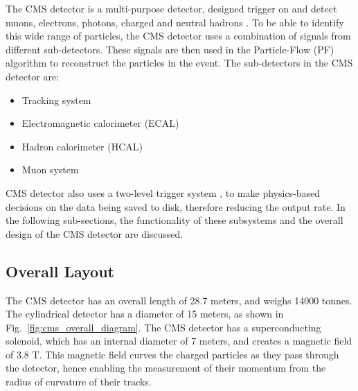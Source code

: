 The CMS detector is a multi-purpose detector, designed trigger on \cite{cms:l1_paper,cms:hlt_paper} and detect muons, electrons, photons, charged and 
neutral hadrons \cite{cms:elepho_paper,cms:muon_paper,cms:vertex_paper}. To be able to identify this wide range of particles, the CMS detector uses a combination of signals from different sub-detectors. These signals
are then used in the Particle-Flow (PF) algorithm to reconstruct the particles in the event. The sub-detectors in the CMS detector are:

\begin{itemize}
    \item Tracking system
    \item Electromagnetic calorimeter (ECAL)
    \item Hadron calorimeter (HCAL)
    \item Muon system
\end{itemize}

CMS detector also uses a two-level trigger system \cite{cms:l1_paper,cms:hlt_paper}, to make physics-based decisions on the data being saved to disk, 
therefore reducing the output rate. In the following sub-sections, the functionality of these subsystems and the overall design of the CMS detector are discussed.

\subsection{Overall Layout}

The CMS detector has an overall length of 28.7 meters, and weighs 14000 tonnes. The cylindrical detector
has a diameter of 15 meters, as shown in Fig.~\ref{fig:cms_overall_diagram}. The CMS detector has a superconducting solenoid,
which has an internal diameter of 7 meters, and creates a magnetic field of 3.8 T. This magnetic field curves the charged particles
as they pass through the detector, hence enabling the measurement of their momentum from the radius of curvature of their tracks.


